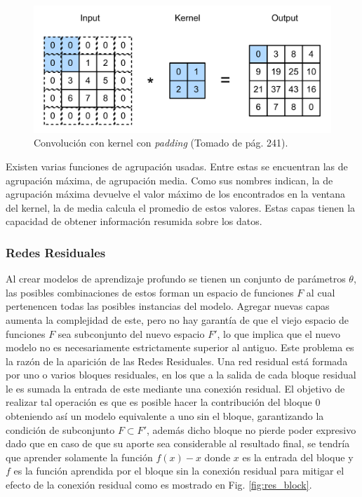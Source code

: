 \begin{figure}[h!]
	\begin{center}
		\begin{center}
			\includegraphics[scale=.3]{Graphics/kernel_convolution_padding.png}
        \end{center}
	    \caption{Convolución con kernel con \emph{padding} (Tomado de \cite{d2l} pág. 241).}\label{fig:conv_kernel_padding}
	\end{center}
\end{figure}

Existen varias funciones de agrupación usadas. Entre estas se encuentran las de agrupación máxima, de 
agrupación media. Como sus nombres indican, la de agrupación máxima devuelve el valor máximo de los encontrados
en la ventana del kernel, la de media calcula el promedio de estos valores. Estas capas tienen la capacidad de obtener
información resumida sobre los datos.

\subsubsection{Redes Residuales}

Al crear modelos de aprendizaje profundo se tienen un conjunto de parámetros $\theta$, las posibles combinaciones 
de estos forman un espacio de funciones $F$ al cual pertenencen todas las posibles instancias del modelo.
Agregar nuevas capas aumenta la complejidad de este, pero no hay garantía de que el viejo espacio 
de funciones $F$ sea subconjunto del nuevo espacio $F'$, lo que implica que el nuevo modelo no es necesariamente
estrictamente superior al antiguo. Este problema es la razón de la aparición de las Redes Residuales. 
Una red residual está formada por 
uno o varios bloques residuales, en los que a la salida de cada bloque residual le es sumada la entrada de 
este mediante una conexión residual.
El objetivo de realizar tal operación es que es posible hacer la contribución del bloque 0 obteniendo así
un modelo equivalente a uno sin el bloque, garantizando la condición de subconjunto $F \subset F'$, además 
dicho bloque no pierde poder expresivo dado que en caso de que su aporte sea considerable al resultado final, 
se tendría que aprender solamente la función $f(x) - x$ donde $x$ es la entrada del bloque y $f$ es la función 
aprendida por el bloque sin la conexión residual para mitigar el efecto de la conexión residual como es mostrado
en Fig. \ref{fig:res_block}.

